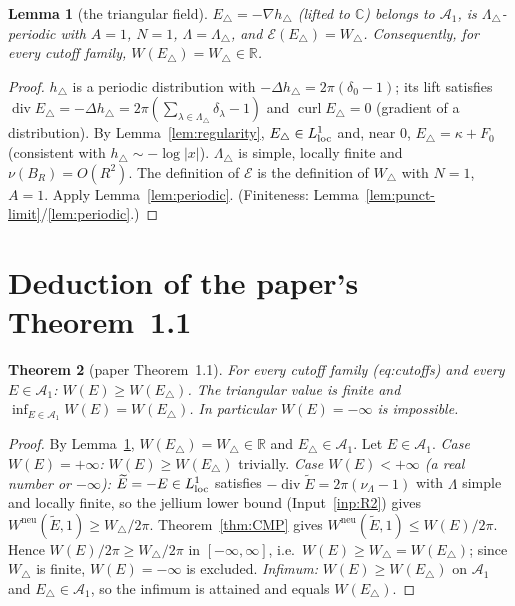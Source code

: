 \documentclass[11pt]{article}
\newtheorem{theorem}{Theorem}[section]
\newtheorem{lemma}[theorem]{Lemma}
\theoremstyle{definition}
\theoremstyle{remark}
\newcommand{\R}{\mathbb R}
\newcommand{\C}{\mathbb C}
\newcommand{\Lam}{\Lambda}
\newcommand{\tE}{\widetilde E}
\newcommand{\Wneu}{W^{\mathrm{neu}}}
\DeclareMathOperator{\Div}{div}
\begin{document}
\begin{lemma}[the triangular field]\label{lem:tri}
$E_\triangle=-\nabla h_\triangle$ (lifted to $\C$) belongs to $\mathcal A_1$, is $\Lam_\triangle$-periodic with $A=1$, $N=1$, $\Lam=\Lam_\triangle$, and $\mathcal E(E_\triangle)=W_\triangle$.  Consequently, for \emph{every} cutoff family, $W(E_\triangle)=W_\triangle\in\R$.
\end{lemma}
\begin{proof}
$h_\triangle$ is a periodic distribution with $-\Delta h_\triangle=2\pi(\delta_0-1)$; its lift satisfies $\Div E_\triangle=-\Delta h_\triangle=2\pi(\sum_{\lambda\in\Lam_\triangle}\delta_\lambda-1)$ and $\operatorname{curl}E_\triangle=0$ (gradient of a distribution).  By Lemma~\ref{lem:regularity}, $E_\triangle\in L^1_{\rm loc}$ and, near $0$, $E_\triangle=\kappa+F_0$ (consistent with $h_\triangle\sim-\log|x|$).  $\Lam_\triangle$ is simple, locally finite and $\nu(B_R)=O(R^2)$.  The definition of $\mathcal E$ is the definition of $W_\triangle$ with $N=1$, $A=1$.  Apply Lemma~\ref{lem:periodic}.  (Finiteness: Lemma~\ref{lem:punct-limit}/\ref{lem:periodic}.)
\end{proof}

\section{Deduction of the paper's Theorem~1.1}

\begin{theorem}[paper Theorem~1.1]\label{thm:main-deduced}
For every cutoff family (eq:cutoffs) and every $E\in\mathcal A_1$: $W(E)\ge W(E_\triangle)$.  The triangular value is finite and $\inf_{E\in\mathcal A_1}W(E)=W(E_\triangle)$.  In particular $W(E)=-\infty$ is impossible.
\end{theorem}
\begin{proof}
By Lemma~\ref{lem:tri}, $W(E_\triangle)=W_\triangle\in\R$ and $E_\triangle\in\mathcal A_1$.  Let $E\in\mathcal A_1$.
\emph{Case $W(E)=+\infty$:} $W(E)\ge W(E_\triangle)$ trivially.
\emph{Case $W(E)<+\infty$ (a real number or $-\infty$):}
$\tE=-E\in L^1_{\rm loc}$ satisfies $-\Div\tE=2\pi(\nu_\Lam-1)$ with $\Lam$ simple and locally finite, so the jellium lower bound (Input~\ref{inp:R2}) gives $\Wneu(\tE,1)\ge W_\triangle/2\pi$.  Theorem~\ref{thm:CMP} gives $\Wneu(\tE,1)\le W(E)/2\pi$.  Hence $W(E)/2\pi\ge W_\triangle/2\pi$ in $[-\infty,\infty]$, i.e.\ $W(E)\ge W_\triangle=W(E_\triangle)$; since $W_\triangle$ is finite, $W(E)=-\infty$ is excluded.
\emph{Infimum:} $W(E)\ge W(E_\triangle)$ on $\mathcal A_1$ and $E_\triangle\in\mathcal A_1$, so the infimum is attained and equals $W(E_\triangle)$.
\end{proof}
\end{document}

